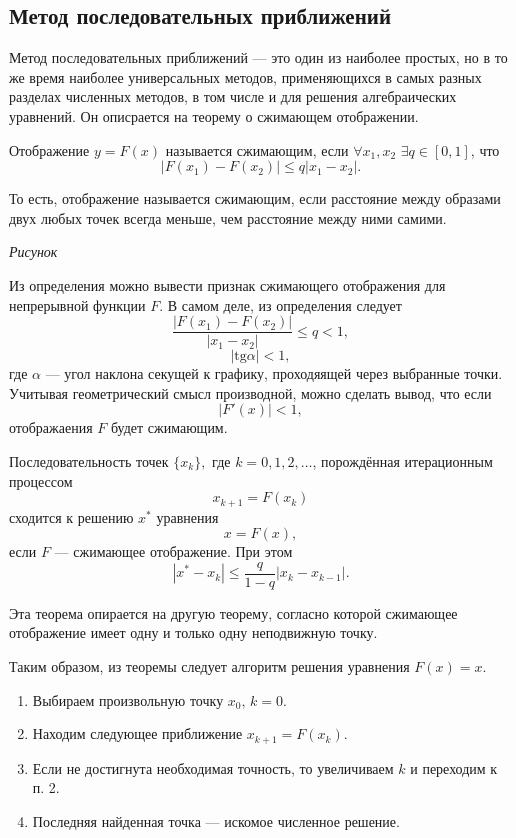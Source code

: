 \subsection{Метод последовательных приближений}

Метод последовательных приближений — это один из наиболее простых, но
в то же время наиболее универсальных методов, применяющихся в самых
разных разделах численных методов, в том числе и для решения
алгебраических уравнений. Он описрается на теорему о сжимающем
отображении.
\begin{defn}
Отображение $y=F(x)$ называется сжимающим, если $\forall x_{1},x_{2}$
$\exists q\in[0,1]$, что
\[
|F(x_{1})-F(x_{2})|\leqslant q|x_{1}-x_{2}|.
\]

\end{defn}
То есть, отображение называется сжимающим, если расстояние между
образами двух любых точек всегда меньше, чем расстояние между ними
самими.

\emph{Рисунок}

Из определения можно вывести признак сжимающего отображения для
непрерывной функции $F$. В самом деле, из определения следует
\[
\frac{|F(x_{1})-F(x_{2})|}{|x_{1}-x_{2}|}\leqslant q<1,
\]
\[
|\mathrm{tg}\alpha|<1,
\]
где $\alpha$ — угол наклона секущей к графику, проходяящей через
выбранные точки. Учитывая геометрический смысл производной, можно
сделать вывод, что если
\[
|F'(x)|<1,
\]
отображаения $F$ будет сжимающим.
\begin{thm}
Последовательность точек $\{x_{k}\},$ где $k=0,1,2,\dots$, порождённая
итерационным процессом 
\[
x_{k+1}=F(x_{k})
\]
 сходится к решению $x^{*}$ уравнения 
\[
x=F(x),
\]
если $F$ — сжимающее отображение. При этом
\[
|x^{*}-x_{k}|\leqslant\frac{q}{1-q}|x_{k}-x_{k-1}|.
\]

\end{thm}
Эта теорема опирается на другую теорему, согласно которой сжимающее
отображение имеет одну и только одну неподвижную точку.

Таким образом, из теоремы следует алгоритм решения уравнения $F(x)=x$.
\begin{enumerate}
\item Выбираем произвольную точку $x_{0},\, k=0$.
\item Находим следующее приближение $x_{k+1}=F(x_{k})$.
\item Если не достигнута необходимая точность, то увеличиваем $k$ и
  переходим к п. 2.
\item Последняя найденная точка — искомое численное решение.
\end{enumerate}

